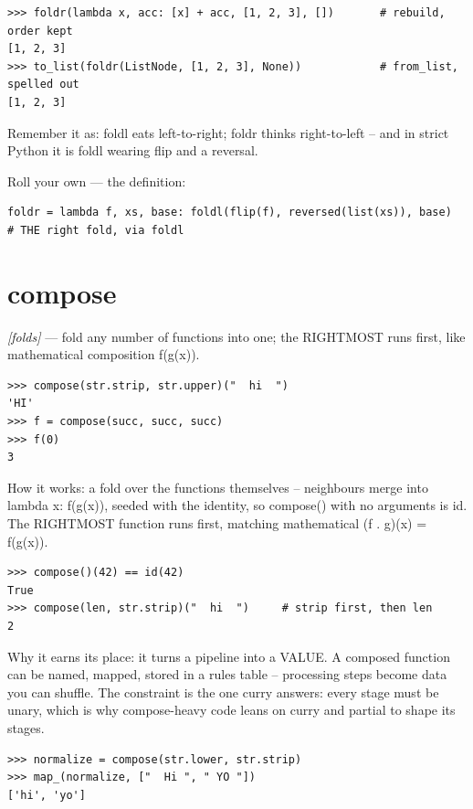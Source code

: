 \documentclass[11pt,letterpaper]{book}
\begin{document}
\begin{lstlisting}[style=spec]
>>> foldr(lambda x, acc: [x] + acc, [1, 2, 3], [])       # rebuild, order kept
[1, 2, 3]
>>> to_list(foldr(ListNode, [1, 2, 3], None))            # from_list, spelled out
[1, 2, 3]
\end{lstlisting}

Remember it as: foldl eats left-to-right; foldr thinks right-to-left -- and in strict Python it is foldl wearing flip and a reversal.


Roll your own --- the definition:

\begin{lstlisting}[style=code]
foldr = lambda f, xs, base: foldl(flip(f), reversed(list(xs)), base)  # THE right fold, via foldl
\end{lstlisting}

\section{compose}
\noindent\textit{[folds]} --- fold any number of functions into one; the RIGHTMOST runs first, like mathematical composition f(g(x)).
\begin{lstlisting}[style=spec]
>>> compose(str.strip, str.upper)("  hi  ")
'HI'
>>> f = compose(succ, succ, succ)
>>> f(0)
3
\end{lstlisting}

How it works: a fold over the functions themselves -- neighbours merge into lambda x: f(g(x)), seeded with the identity, so compose() with no arguments is id. The RIGHTMOST function runs first, matching mathematical (f . g)(x) = f(g(x)).

\begin{lstlisting}[style=spec]
>>> compose()(42) == id(42)
True
>>> compose(len, str.strip)("  hi  ")     # strip first, then len
2
\end{lstlisting}

Why it earns its place: it turns a pipeline into a VALUE. A composed function can be named, mapped, stored in a rules table -- processing steps become data you can shuffle. The constraint is the one curry answers: every stage must be unary, which is why compose-heavy code leans on curry and partial to shape its stages.

\begin{lstlisting}[style=spec]
>>> normalize = compose(str.lower, str.strip)
>>> map_(normalize, ["  Hi ", " YO "])
['hi', 'yo']
\end{lstlisting}
\end{document}
